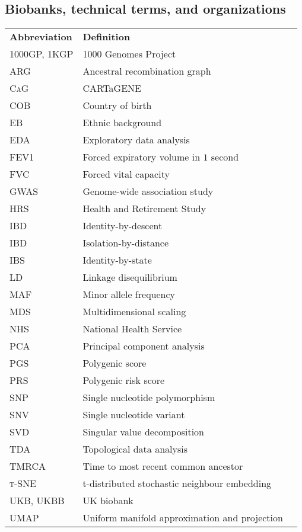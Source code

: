 
\subsection*{Biobanks, technical terms, and organizations}

\begin{table}[!h]
\hspace{1.0cm}
\begin{tabular}{l l r}

\textbf{Abbreviation} & \textbf{Definition} \\ [1ex]
\textsc{1000GP, 1KGP}  &  1000 Genomes Project \\ [1ex]
\textsc{ARG}  &  Ancestral recombination graph \\ [1ex]
\textsc{CaG}  &  CARTaGENE \\ [1ex]
\textsc{COB}  &  Country of birth \\ [1ex]
\textsc{EB}  &  Ethnic background \\ [1ex]
\textsc{EDA}  &  Exploratory data analysis \\ [1ex]
\textsc{FEV1}  &  Forced expiratory volume in $1$ second \\ [1ex]
\textsc{FVC}  &  Forced vital capacity \\ [1ex]
\textsc{GWAS}  &  Genome-wide association study \\ [1ex]
\textsc{HRS}  &  Health and Retirement Study \\ [1ex]
\textsc{IBD}  &  Identity-by-descent \\ [1ex]
\textsc{IBD}  &  Isolation-by-distance \\ [1ex]
\textsc{IBS}  &  Identity-by-state \\ [1ex]
\textsc{LD}  &  Linkage disequilibrium \\ [1ex]
\textsc{MAF}  &  Minor allele frequency \\ [1ex]
\textsc{MDS}  &  Multidimensional scaling \\ [1ex]
\textsc{NHS}  &  National Health Service \\ [1ex]
\textsc{PCA}  & Principal component analysis \\ [1ex]
\textsc{PGS}  &  Polygenic score \\ [1ex]
\textsc{PRS}  &  Polygenic risk score \\ [1ex]
\textsc{SNP}  &  Single nucleotide polymorphism \\ [1ex]
\textsc{SNV}  &  Single nucleotide variant \\ [1ex]
\textsc{SVD}  &  Singular value decomposition \\ [1ex]
\textsc{TDA}  &  Topological data analysis \\ [1ex]
\textsc{TMRCA}  &  Time to most recent common ancestor \\ [1ex]
\textsc{{t}-SNE}  &  t-distributed stochastic neighbour embedding \\ [1ex]
\textsc{UKB, UKBB}  &  UK biobank \\ [1ex]
\textsc{UMAP}  &  Uniform manifold approximation and projection \\ [1ex]


\end{tabular}
\end{table}
